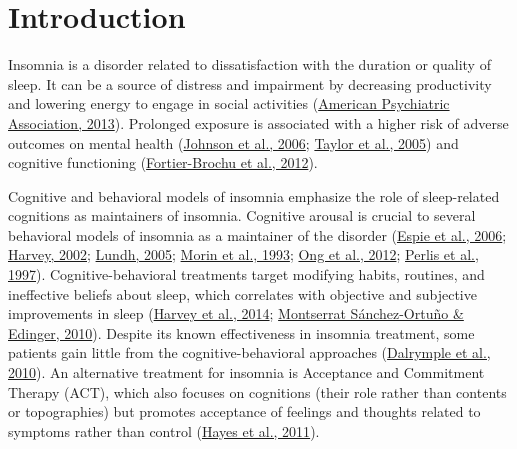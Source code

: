 \documentclass[
  ,doc,11pt, twoside,floatsintext]{apa6}
\begin{document}
\newpage

\hypertarget{introduction}{%
\section{Introduction}\label{introduction}}

Insomnia is a disorder related to dissatisfaction with the duration or quality of sleep. It can be a source of distress and impairment by decreasing productivity and lowering energy to engage in social activities (\protect\hyperlink{ref-americanpsychiatricassociation2013}{American Psychiatric Association, 2013}). Prolonged exposure is associated with a higher risk of adverse outcomes on mental health (\protect\hyperlink{ref-johnson2006}{Johnson et al., 2006}; \protect\hyperlink{ref-taylor2005}{Taylor et al., 2005}) and cognitive functioning (\protect\hyperlink{ref-fortier-brochu2012}{Fortier-Brochu et al., 2012}).

Cognitive and behavioral models of insomnia emphasize the role of sleep-related cognitions as maintainers of insomnia. Cognitive arousal is crucial to several behavioral models of insomnia as a maintainer of the disorder (\protect\hyperlink{ref-espie2006}{Espie et al., 2006}; \protect\hyperlink{ref-harvey2002}{Harvey, 2002}; \protect\hyperlink{ref-lundh2005}{Lundh, 2005}; \protect\hyperlink{ref-morin1993}{Morin et al., 1993}; \protect\hyperlink{ref-ong2012}{Ong et al., 2012}; \protect\hyperlink{ref-perlis1997}{Perlis et al., 1997}). Cognitive-behavioral treatments target modifying habits, routines, and ineffective beliefs about sleep, which correlates with objective and subjective improvements in sleep (\protect\hyperlink{ref-harvey2014}{Harvey et al., 2014}; \protect\hyperlink{ref-montserratsanchez-ortuno2010}{Montserrat Sánchez-Ortuño \& Edinger, 2010}). Despite its known effectiveness in insomnia treatment, some patients gain little from the cognitive-behavioral approaches (\protect\hyperlink{ref-dalrymple2010}{Dalrymple et al., 2010}). An alternative treatment for insomnia is Acceptance and Commitment Therapy (ACT), which also focuses on cognitions (their role rather than contents or topographies) but promotes acceptance of feelings and thoughts related to symptoms rather than control (\protect\hyperlink{ref-hayes2011acceptance}{Hayes et al., 2011}).
\end{document}
